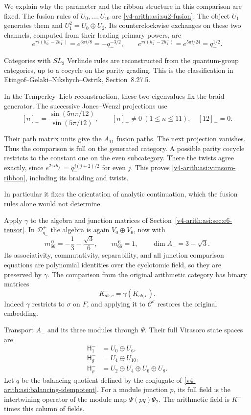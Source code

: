 We explain why the parameter and the ribbon structure in this
comparison are fixed. The fusion rules of $U_0,\ldots,U_{10}$ are
\eqref{v4-arith:asi:su2-fusion}. The object $U_1$ generates them and
$U_1^2=U_0\oplus U_2$. Its counterclockwise exchanges on these two
channels, computed from their leading primary powers, are
\[
 e^{\pi i(h_0^--2h_1^-)}=e^{3\pi i/8}=-q_-^{-3/2},\qquad
 e^{\pi i(h_2^--2h_1^-)}=e^{5\pi i/24}=q_-^{1/2}.
\]


Categories with \(SL_2\) Verlinde rules are reconstructed from
the quantum-group categories, up to a cocycle on the parity grading.
This is the classification in Etingof--Gelaki--Nikshych--Ostrik,
Section~8.27.5.

In the Temperley--Lieb reconstruction,
these two eigenvalues fix the braid generator. The successive
Jones--Wenzl projections use
\[
 [n]_- =\frac{\sin(5n\pi/12)}{\sin(5\pi/12)},
 \qquad [n]_-\ne0\ (1\leq n\leq11),\quad [12]_-=0.
\]


Their path matrix units give the $A_{11}$ fusion paths. The next
projection vanishes. Thus the comparison is full on the generated
category. A possible parity cocycle restricts to the constant one on the even
subcategory. There the twists agree exactly, since
$e^{2\pi i h_j^-}=q_-^{j(j+2)/2}$ for even $j$.
This proves \eqref{v4-arith:asi:virasoro-ribbon}, including its braiding
and twists.

In particular it fixes the orientation of analytic
continuation, which the fusion rules alone would not determine.

Apply $\gamma$ to the algebra and junction matrices of
Section~\ref{v4-arith:asi:sec:e6-tensor}. In $\mathcal D_{q_-}^+$ the
algebra is again $V_0\oplus V_6$, now with
\[
 m_{66}^{\,0}=-\frac13-\frac{\sqrt3}{6},\qquad m_{66}^{\,6}=1,
 \qquad \dim A_-=3-\sqrt3.
\]
Its associativity, commutativity, separability, and all junction
comparison equations are polynomial identities over the cyclotomic
field, so they are preserved by $\gamma$. The comparison from the
original arithmetic category has binary matrices
\begin{equation}\label{v4-arith:asi:native-junction-map}
 K^-_{ab;c}=\gamma(K_{ab;c}).
\end{equation}
Indeed $\gamma$ restricts to $\sigma$ on $F$, and applying it to
$\mathcal C^\sigma$ restores the original embedding.

Transport $A_-$ and its three modules through $\Psi$. Their full
Virasoro state spaces are
\begin{equation}\label{v4-arith:asi:native-full-states}
 \begin{split}
 \mathsf H^-_1&=U_0\oplus U_6,\\
 \mathsf H^-_g&=U_4\oplus U_{10},\\
 \mathsf H^-_\rho&=U_2\oplus U_4\oplus U_6\oplus U_8.
 \end{split}
\end{equation}
Let $q$ be the balancing quotient defined by the conjugate of
\eqref{v4-arith:asi:balancing-idempotent}.
For a module junction $p$, its full field is the intertwining operator
of the module map $\Psi(pq)\Psi_2$.
The arithmetic field is $K^-$ times this column of fields.

